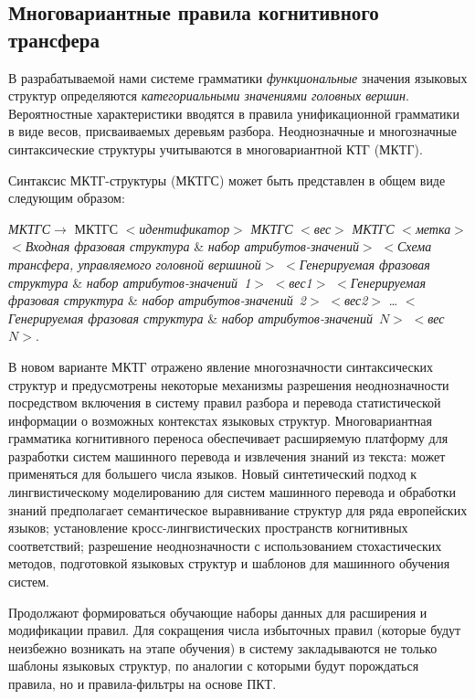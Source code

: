 \begin{multicols}{2}
\subsection{Многовариантные правила когнитивного трансфера}

В разрабатываемой нами системе грамматики \textit{функциональные}
значения языковых структур определяются \textit{категориальными
значениями головных вершин}. Вероятностные характеристики вводятся в
правила унификационной грамматики в виде весов, присваиваемых деревьям
разбора. Неоднозначные и многозначные синтаксические структуры
учитываются в многовариантной КТГ (МКТГ).

Синтаксис МКТГ-структуры (МКТГС) может быть представлен в общем виде
следующим образом:

\noindent
\textit{МКТГС}\;$\rightarrow$\; МКТГС $<$\textit{идентификатор}$>$
\textit{МКТГС} $<$\textit{вес}$>$ \textit{МКТГС} $<$\textit{метка}$>$
$<$\textit{Входная фразовая структура} \& \textit{набор
атрибутов-значений}$>$ $<$\textit{Схема трансфера, управляемого
головной вершиной}$>$ $<$\textit{Генерируемая фразовая структура} \&
\textit{набор атрибутов-значений~1}$>$ $<$\textit{вес1}$>$
$<$\textit{Генерируемая фразовая структура} \& \textit{набор
атрибутов-значений~2}$>$ $<$\textit{вес2}$>$ \ldots
$<$\textit{Генерируемая фразовая структура} \& \textit{набор
атрибутов-значений}~$N\!>$ $<$\textit{вес}$N\!>$.

В новом варианте МКТГ отражено явление многозначности синтаксических структур и 
предусмот\-ре\-ны некоторые механизмы разрешения не\-од\-нознач\-но\-сти 
посредством включения в систему правил разбора и перевода статистической 
информации о возможных контекстах языковых структур. Многовариантная грамматика 
когнитивного переноса обеспечивает расширяемую платформу для разработки систем 
машинного перевода и извлечения знаний из текста: может применяться для 
большего числа языков. Новый синтетический подход к лингвистическому 
моделированию для систем машинного перевода и обработки знаний предполагает 
семантическое выравнивание структур для ряда европейских языков; установление 
кросс-лингвистических пространств когнитивных соответствий;  разрешение 
неоднозначности с использованием стохастических методов, подготовкой языковых 
структур и шаблонов для машинного обучения систем.

Продолжают формироваться обучающие наборы данных для расширения и модификации 
правил. Для сокращения числа избыточных правил (которые будут неизбежно 
возникать на этапе обуче\-ния) в систему закладываются не только шаблоны 
языковых структур, по аналогии с которыми будут порождаться правила, но и 
правила-фильтры на основе ПКТ.


\end{multicols}
